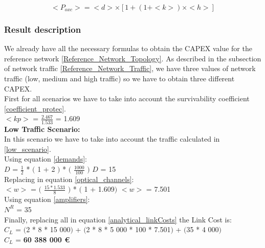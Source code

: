 \begin{equation}
<P_{oxc}> = <d> \times [1 + \left(1 + <k>\right) \times <h>]
\label{Poxc_transp_protec}
\end{equation}


\subsubsection{Result description}

We already have all the necessary formulas to obtain the CAPEX value for the reference network \ref{Reference_Network_Topology}. As described in the subsection of network traffic \ref{Reference_Network_Traffic}, we have three values of network traffic (low, medium and high traffic) so we have to obtain three different CAPEX.\\

First for all scenarios we have to take into account the survivability coefficient \ref{coefficient_protec}.\\

$<kp>$ = $\frac{2.467}{1.533}$ = 1.609\\

\textbf{Low Traffic Scenario:}\\
In this scenario we have to take into account the traffic calculated in \ref{low_scenario}.\\

Using equation \ref{demands}:\\

$D$ = $\frac{1}{2}$ * $($ 1 + 2 $)$ * $($ $\frac{1000}{100}$ $)$ \qquad \qquad $D$ = 15\\

Replacing in equation \ref{optical_channels}:\\

$<w>$ = $($ $\frac{15 * 1.533}{8}$ $)$ * $($ 1 + 1.609$)$ \qquad \qquad $<w>$ = 7.501\\

Using equation \ref{amplifiers}:\\

$N^R$ = 35\\

Finally, replacing all in equation \ref{analytical_linkCosts} the Link Cost is:\\

$C_L$ = $($2 * 8 * 15 000$)$ + $($2 * 8 * 5 000 * 100 * 7.501$)$ + $($35 * 4 000$)$\\

$C_L$ = \textbf{60 388 000 \euro}\\

